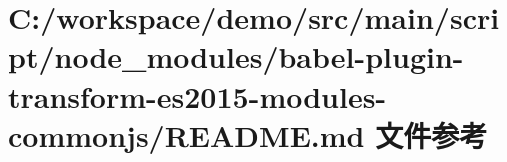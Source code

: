 \hypertarget{node__modules_2babel-plugin-transform-es2015-modules-commonjs_2_r_e_a_d_m_e_8md}{}\section{C\+:/workspace/demo/src/main/script/node\+\_\+modules/babel-\/plugin-\/transform-\/es2015-\/modules-\/commonjs/\+R\+E\+A\+D\+ME.md 文件参考}
\label{node__modules_2babel-plugin-transform-es2015-modules-commonjs_2_r_e_a_d_m_e_8md}
